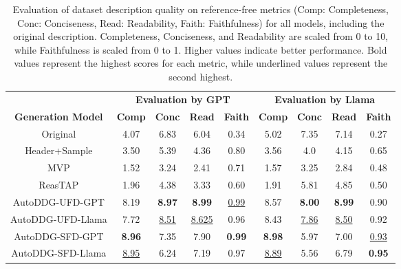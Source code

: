 \begin{table*}[h]
\begin{center}

  \begin{tabular}{c|cccc|cccc}
    \hline
      & \multicolumn{4}{c|}{\bf Evaluation by GPT} & \multicolumn{4}{c}{\bf Evaluation by Llama} \\
    \bf Generation Model & \bf Comp & \bf Conc & \bf Read & \bf Faith & \bf Comp & \bf Conc & \bf Read & \bf Faith\\
    \hline
    Original & 4.07 & 6.83 & 6.04 & 0.34 & 5.02 & 7.35 & 7.14 & 0.27\\
    \hline
    Header+Sample & 3.50 & 5.39 & 4.36 & 0.80 & 3.56 & 4.0 & 4.15 & 0.65\\
    MVP & 1.52 & 3.24 & 2.41 & 0.71 & 1.57 & 3.25 & 2.84 & 0.48\\
    ReasTAP & 1.96 & 4.38 & 3.33 & 0.60 & 1.91 & 5.81 & 4.85 & 0.50\\
    \hline
    AutoDDG-UFD-GPT & 8.19 & \bf 8.97 & \bf 8.99 & \underline{0.99} & 8.57 & \bf 8.00 & \bf 8.99 & 0.90\\
    AutoDDG-UFD-Llama & 7.72& \underline{8.51} & \underline{8.625} & 0.96 & 8.43 & \underline{7.86} & \underline{8.50} & 0.92\\
    AutoDDG-SFD-GPT & \bf 8.96 & 7.35 & 7.90  & \bf 0.99 & \bf 8.98 & 5.97 & 7.00 & \underline{0.93}\\
    AutoDDG-SFD-Llama & \underline{8.95} & 6.24 & 7.19 & 0.97 & \underline{8.89} & 5.56 & 6.79 & \bf 0.95\\
  \hline
\end{tabular}
\end{center}
\caption{Evaluation of dataset description quality on reference-free metrics (Comp: Completeness, Conc: Conciseness, Read: Readability, Faith: Faithfulness) for all models, including the original description. Completeness, Conciseness, and Readability are scaled from 0 to 10, while Faithfulness is scaled from 0 to 1. Higher values indicate better performance. Bold values represent the highest scores for each metric, while underlined values represent the second highest.}
  \label{tab:eval_reference_free}
\vspace{-.3cm}
\end{table*}

